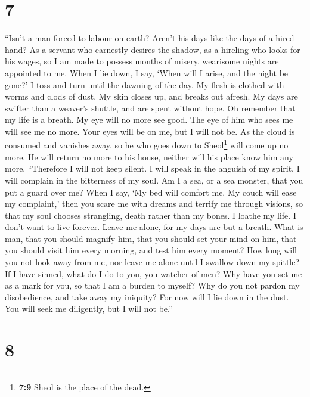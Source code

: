 \hypertarget{section-6}{%
\section{7}\label{section-6}}

 ``Isn't a man forced to labour on earth? Aren't his days
like the days of a hired hand?  As a servant who earnestly
desires the shadow, as a hireling who looks for his wages,
 so I am made to possess months of misery, wearisome
nights are appointed to me.  When I lie down, I say, `When
will I arise, and the night be gone?' I toss and turn until the dawning
of the day.  My flesh is clothed with worms and clods of
dust. My skin closes up, and breaks out afresh.  My days
are swifter than a weaver's shuttle, and are spent without hope.
 Oh remember that my life is a breath. My eye will no more
see good.  The eye of him who sees me will see me no more.
Your eyes will be on me, but I will not be.  As the cloud
is consumed and vanishes away, so he who goes down to Sheol\footnote{\textbf{7:9}
  Sheol is the place of the dead.} will come up no more. 
He will return no more to his house, neither will his place know him any
more.  ``Therefore I will not keep silent. I will speak
in the anguish of my spirit. I will complain in the bitterness of my
soul.  Am I a sea, or a sea monster, that you put a guard
over me?  When I say, `My bed will comfort me. My couch
will ease my complaint,'  then you scare me with dreams
and terrify me through visions,  so that my soul chooses
strangling, death rather than my bones.  I loathe my
life. I don't want to live forever. Leave me alone, for my days are but
a breath.  What is man, that you should magnify him, that
you should set your mind on him,  that you should visit
him every morning, and test him every moment?  How long
will you not look away from me, nor leave me alone until I swallow down
my spittle?  If I have sinned, what do I do to you, you
watcher of men? Why have you set me as a mark for you, so that I am a
burden to myself?  Why do you not pardon my disobedience,
and take away my iniquity? For now will I lie down in the dust. You will
seek me diligently, but I will not be.''

\hypertarget{section-7}{%
\section{8}\label{section-7}}

